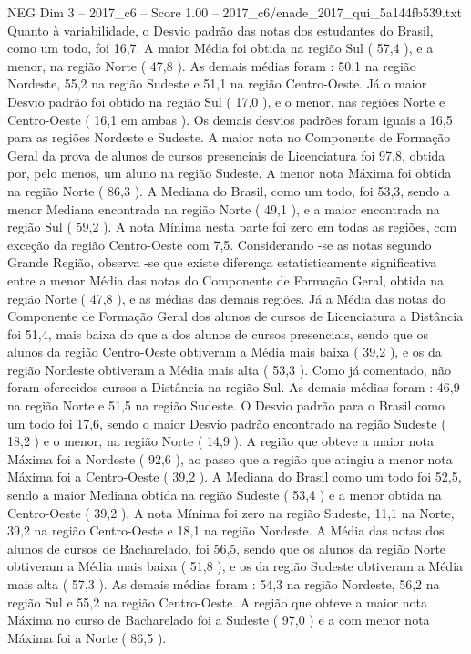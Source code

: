 \begin{textsample}{NEG Dim 3 – 2017\_c6 – Score 1.00 – 2017\_c6/enade\_2017\_qui\_5a144fb539.txt}
Quanto à variabilidade, o Desvio padrão das notas dos estudantes do Brasil, como um todo, foi 16,7.
A maior Média foi obtida na região Sul ( 57,4 ), e a menor, na região Norte ( 47,8 ).
As demais médias foram : 50,1 na região Nordeste, 55,2 na região Sudeste e 51,1 na região Centro-Oeste.
Já o maior Desvio padrão foi obtido na região Sul ( 17,0 ), e o menor, nas regiões Norte e Centro-Oeste ( 16,1 em ambas ).
Os demais desvios padrões foram iguais a 16,5 para as regiões Nordeste e Sudeste.
A maior nota no Componente de Formação Geral da prova de alunos de cursos presenciais de Licenciatura foi 97,8, obtida por, pelo menos, um aluno na região Sudeste.
A menor nota Máxima foi obtida na região Norte ( 86,3 ).
A Mediana do Brasil, como um todo, foi 53,3, sendo a menor Mediana encontrada na região Norte ( 49,1 ), e a maior encontrada na região Sul ( 59,2 ).
A nota Mínima nesta parte foi zero em todas as regiões, com exceção da região Centro-Oeste com 7,5.
Considerando -se as notas segundo Grande Região, observa -se que existe diferença estatisticamente significativa entre a menor Média das notas do Componente de Formação Geral, obtida na região Norte ( 47,8 ), e as médias das demais regiões.
Já a Média das notas do Componente de Formação Geral dos alunos de cursos de Licenciatura a Distância foi 51,4, mais baixa do que a dos alunos de cursos presenciais, sendo que os alunos da região Centro-Oeste obtiveram a Média mais baixa ( 39,2 ), e os da região Nordeste obtiveram a Média mais alta ( 53,3 ).
Como já comentado, não foram oferecidos cursos a Distância na região Sul.
As demais médias foram : 46,9 na região Norte e 51,5 na região Sudeste.
O Desvio padrão para o Brasil como um todo foi 17,6, sendo o maior Desvio padrão encontrado na região Sudeste ( 18,2 ) e o menor, na região Norte ( 14,9 ).
A região que obteve a maior nota Máxima foi a Nordeste ( 92,6 ), ao passo que a região que atingiu a menor nota Máxima foi a Centro-Oeste ( 39,2 ).
A Mediana do Brasil como um todo foi 52,5, sendo a maior Mediana obtida na região Sudeste ( 53,4 ) e a menor obtida na Centro-Oeste ( 39,2 ).
A nota Mínima foi zero na região Sudeste, 11,1 na Norte, 39,2 na região Centro-Oeste e 18,1 na região Nordeste.
A Média das notas dos alunos de cursos de Bacharelado, foi 56,5, sendo que os alunos da região Norte obtiveram a Média mais baixa ( 51,8 ), e os da região Sudeste obtiveram a Média mais alta ( 57,3 ).
As demais médias foram : 54,3 na região Nordeste, 56,2 na região Sul e 55,2 na região Centro-Oeste.
A região que obteve a maior nota Máxima no curso de Bacharelado foi a Sudeste ( 97,0 ) e a com menor nota Máxima foi a Norte ( 86,5 ).

\end{textsample}
